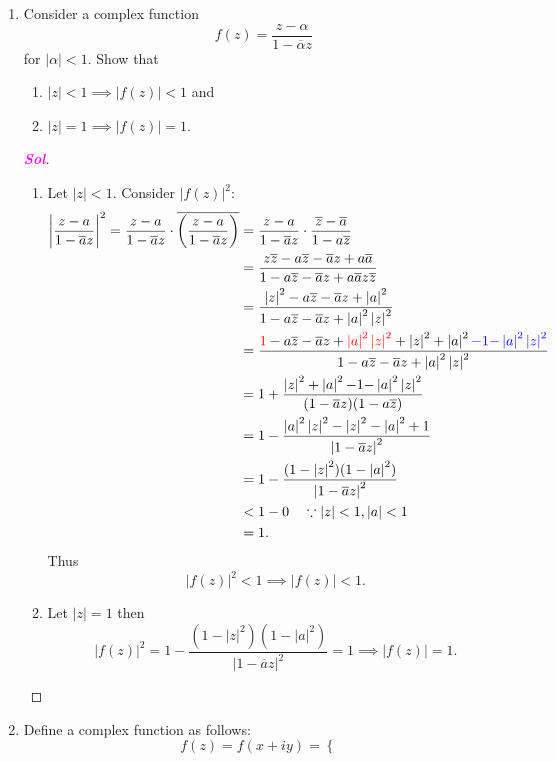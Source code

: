 \documentclass{article}
\theoremstyle{definition}
\newcommand{\of}[1]{\left( #1 \right)}
\newcommand{\abs}[1]{\left\lvert #1 \right\rvert}
\newcommand{\sol}{\textcolor{magenta}{\bf Sol}}
\newcommand{\conjugate}[1]{\overline{#1}}
\begin{document}
\begin{enumerate}
	\item Consider a complex function \[
	f\of{z}=\frac{z-\alpha}{1-\conjugate{\alpha}z}
	\] for $\abs{\alpha}<1$. Show that \begin{enumerate}
		\item $\abs{z}<1\implies\abs{f\of{z}}<1$ and
		\item $\abs{z}=1\implies\abs{f\of{z}}=1$.
	\end{enumerate}
	\begin{proof}[\sol]
		\begin{enumerate}
			\item Let $\abs{z}<1$. Consider $\abs{f\of{z}}^2$:
			\begin{align*}
				\left|\frac{z-a}{1-\conjugate{a}z}\right|^2=\frac{z-a}{1-\conjugate{a}z}\cdot\conjugate{\of{\frac{z-a}{1-\conjugate{a}z}}}&=\frac{z-a}{1-\conjugate{a}z}\cdot\frac{\conjugate{z}-\conjugate{a}}{1-a\conjugate{z}}\\
				&=\frac{z\conjugate{z}-a\conjugate{z}-\conjugate{a}z+a\conjugate{a}}{1-a\conjugate{z}-\conjugate{a}z+a\conjugate{a}z\conjugate{z}}\\
				&=\frac{\abs{z}^2-a\conjugate{z}-\conjugate{a}z+\abs{a}^2}{1-a\conjugate{z}-\conjugate{a}z+\abs{a}^2\abs{z}^2}\\
				&=\frac{\textcolor{red}{1}-a\conjugate{z}-\conjugate{a}z+\textcolor{red}{\abs{a}^2\abs{z}^2}+\abs{z}^2+\abs{a}^2\textcolor{blue}{-1}\textcolor{blue}{-\abs{a}^2\abs{z}^2}}{1-a\conjugate{z}-\conjugate{a}z+\abs{a}^2\abs{z}^2}\\
				&=1+\frac{\abs{z}^2+\abs{a}^2{-1}{-\abs{a}^2\abs{z}^2}}{(1-\conjugate{a}z)(1-a\conjugate{z})}\\
				&=1-\frac{{\abs{a}^2\abs{z}^2}-\abs{z}^2-\abs{a}^2+1}{\abs{1-\conjugate{a}z}^2}\\
				&=1-\frac{(1-\abs{z}^2)(1-\abs{a}^2)}{\abs{1-\conjugate{a}z}^2}\\
				&< 1-0\quad\because\abs{z}< 1, \abs{a}<1\\
				&=1.
			\end{align*} Thus \[
			\abs{f\of{z}}^2<1\implies\abs{f\of{z}}<1.
			\]
			
			\item Let $\abs{z}=1$ then \[
			\abs{f\of{z}}^2=1-\frac{(1-\abs{z}^2)(1-\abs{a}^2)}{\abs{1-\conjugate{a}z}^2}=1\implies\abs{f\of{z}}=1.
			\]
		\end{enumerate}
	\end{proof}
	
	\item Define a complex function as follows: \[
	f\of{z}=f\of{x+iy}=\begin{cases}
		

\end{cases}\]
\end{enumerate}
\end{document}
